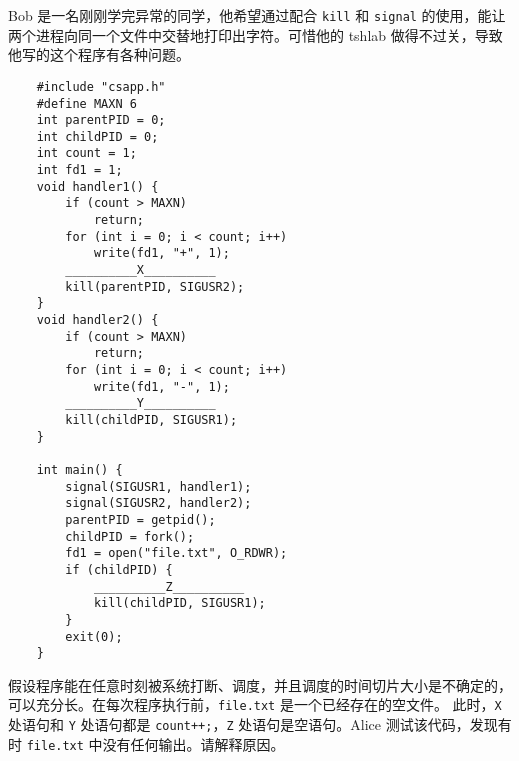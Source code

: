 \begin{problems}
         Bob 是一名刚刚学完异常的同学，他希望通过配合 \verb|kill| 和 \verb|signal| 的使用，能让两个进程向同一个文件中交替地打印出字符。可惜他的 tshlab 做得不过关，导致他写的这个程序有各种问题。
        \begin{verbatim}
    #include "csapp.h"
    #define MAXN 6
    int parentPID = 0;
    int childPID = 0;
    int count = 1;
    int fd1 = 1;
    void handler1() {
        if (count > MAXN)
            return;
        for (int i = 0; i < count; i++)
            write(fd1, "+", 1);
        __________X__________
        kill(parentPID, SIGUSR2);
    }
    void handler2() {
        if (count > MAXN)
            return;
        for (int i = 0; i < count; i++)
            write(fd1, "-", 1);
        __________Y__________
        kill(childPID, SIGUSR1);
    }

    int main() {
        signal(SIGUSR1, handler1);
        signal(SIGUSR2, handler2);
        parentPID = getpid();
        childPID = fork();
        fd1 = open("file.txt", O_RDWR);
        if (childPID) {
            __________Z__________
            kill(childPID, SIGUSR1);
        }
        exit(0);
    }
        \end{verbatim}
        假设程序能在任意时刻被系统打断、调度，并且调度的时间切片大小是不确定的，可以充分长。在每次程序执行前，\verb|file.txt| 是一个已经存在的空文件。
        \qn 此时，\verb|X| 处语句和 \verb|Y| 处语句都是 \verb|count++;|，\verb|Z| 处语句是空语句。Alice 测试该代码，发现有时 \verb|file.txt| 中没有任何输出。请解释原因。
        

\end{problems}
